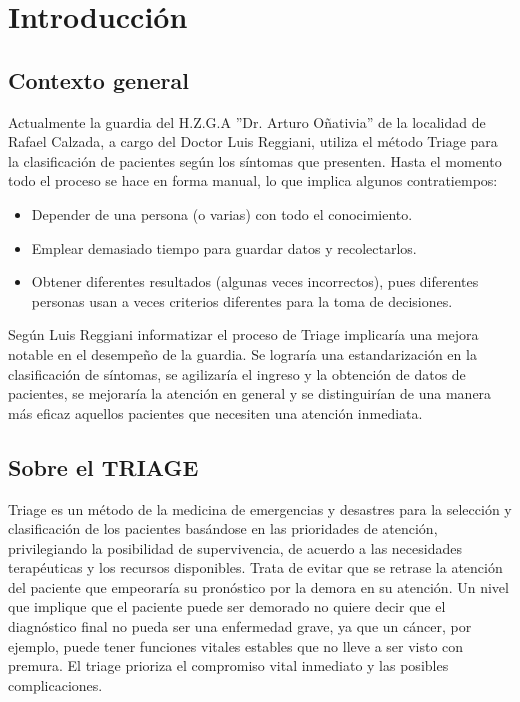 \section{Introducción}
\subsection{Contexto general}
Actualmente la guardia del H.Z.G.A ''Dr. Arturo Oñativia'' de la localidad de Rafael Calzada, a cargo del Doctor Luis Reggiani, utiliza el método Triage \cite{Derlet} \cite{Manual} para la clasificación de pacientes según los síntomas que presenten. Hasta el momento todo el proceso se hace en forma manual, lo que implica algunos contratiempos:
\begin{itemize}
\item Depender de una persona (o varias) con todo el conocimiento.
\item Emplear demasiado tiempo para guardar datos y recolectarlos.
\item Obtener diferentes resultados (algunas veces incorrectos), pues diferentes personas usan a veces criterios diferentes para la toma de decisiones.
\end{itemize}
Según Luis Reggiani informatizar el proceso de Triage implicaría una mejora notable en el desempeño de la guardia. Se lograría una estandarización en la clasificación de síntomas, se agilizaría el ingreso y la obtención de datos de pacientes, se mejoraría la atención en general y se distinguirían de una manera más eficaz aquellos pacientes que necesiten una atención inmediata.
\subsection{Sobre el TRIAGE}
Triage es un método de la medicina de emergencias y desastres para la selección y clasificación de los pacientes basándose en las prioridades de atención, privilegiando la posibilidad de supervivencia, de acuerdo a las necesidades terapéuticas y los recursos disponibles. Trata de evitar que se retrase la atención del paciente que empeoraría su pronóstico por la demora en su atención. Un nivel que implique que el paciente puede ser demorado no quiere decir que el diagnóstico final no pueda ser una enfermedad grave, ya que un cáncer, por ejemplo, puede tener funciones vitales estables que no lleve a ser visto con premura. El triage prioriza el compromiso vital inmediato y las posibles complicaciones.
